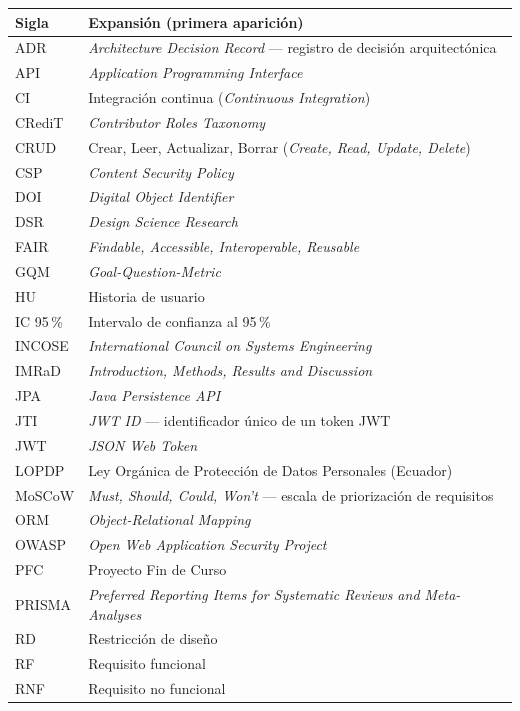 \documentclass[11pt,a4paper]{article}
\begin{document}
\begin{center}
\begin{tabular}{@{}ll@{}}
\toprule
\textbf{Sigla} & \textbf{Expansión (primera aparición)} \\
\midrule
ADR & \emph{Architecture Decision Record} — registro de decisión arquitectónica \\
API & \emph{Application Programming Interface} \\
CI & Integración continua (\emph{Continuous Integration}) \\
CRediT & \emph{Contributor Roles Taxonomy} \\
CRUD & Crear, Leer, Actualizar, Borrar (\emph{Create, Read, Update, Delete}) \\
CSP & \emph{Content Security Policy} \\
DOI & \emph{Digital Object Identifier} \\
DSR & \emph{Design Science Research} \\
FAIR & \emph{Findable, Accessible, Interoperable, Reusable} \\
GQM & \emph{Goal-Question-Metric} \\
HU & Historia de usuario \\
IC 95\,\% & Intervalo de confianza al 95\,\% \\
INCOSE & \emph{International Council on Systems Engineering} \\
IMRaD & \emph{Introduction, Methods, Results and Discussion} \\
JPA & \emph{Java Persistence API} \\
JTI & \emph{JWT ID} — identificador único de un token JWT \\
JWT & \emph{JSON Web Token} \\
LOPDP & Ley Orgánica de Protección de Datos Personales (Ecuador) \\
MoSCoW & \emph{Must, Should, Could, Won't} — escala de priorización de requisitos \\
ORM & \emph{Object-Relational Mapping} \\
OWASP & \emph{Open Web Application Security Project} \\
PFC & Proyecto Fin de Curso \\
PRISMA & \emph{Preferred Reporting Items for Systematic Reviews and Meta-Analyses} \\
RD & Restricción de diseño \\
RF & Requisito funcional \\
RNF & Requisito no funcional \\

\end{tabular}
\end{center}
\end{document}
